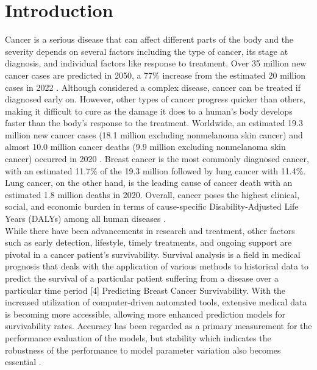 \documentclass[11pt,singlespace]{article}
\begin{document}
	\section {Introduction}
	Cancer is a serious disease that can affect different parts of the body and the severity depends on several factors including the type of cancer, its stage at diagnosis, and individual factors like response to treatment. Over 35 million new cancer cases are predicted in 2050, a 77\% increase from the estimated 20 million cases in 2022 \cite{WHO Statistics}.  Although considered a complex disease, cancer can be treated if diagnosed early on. However, other types of cancer progress quicker than others, making it difficult to cure as the damage it does to a human’s body develops faster than the body’s response to the treatment. Worldwide, an estimated 19.3 million new cancer cases (18.1 million excluding nonmelanoma skin cancer) and almost 10.0 million cancer deaths (9.9 million excluding nonmelanoma skin cancer) occurred in 2020 \cite{Cancer Diagnosis Stats}. Breast cancer is the most commonly diagnosed cancer, with an estimated 11.7\% of the 19.3 million followed by lung cancer with 11.4\%. Lung cancer, on the other hand, is the leading cause of cancer death with an estimated 1.8 million deaths in 2020. Overall, cancer poses the highest clinical, social, and economic burden in terms of cause-specific Disability-Adjusted Life Years (DALYs) among all human diseases \cite{Cancer Epidemiology}.
	\\
	
	While there have been advancements in research and treatment, other factors such as early detection, lifestyle, timely treatments, and ongoing support are pivotal in a cancer patient’s survivability. Survival analysis is a field in medical prognosis that deals with the application of various methods to historical data to predict the survival of a particular patient suffering from a disease over a particular time period [4] Predicting Breast Cancer Survivability. With the increased utilization of computer-driven automated tools, extensive medical data is becoming more accessible, allowing more enhanced prediction models for survivability rates. Accuracy has been regarded as a primary measurement for the performance evaluation of the models, but stability which indicates the robustness of the performance to model parameter variation also becomes essential \cite{Robust predictive model for evaluating breast cancer survivability}. 
	\\
	
\end{document}

